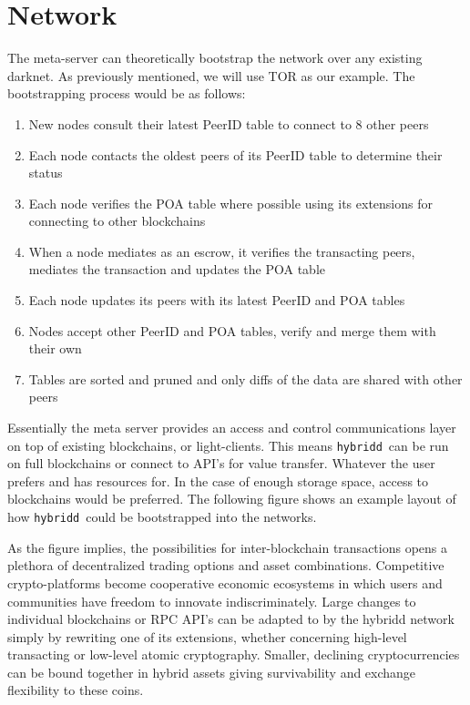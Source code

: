\documentclass[11pt, a4paper]{article}
\newcommand{\hybridd}{\texttt{hybridd}\, }
\begin{document}
\section{Network}

The meta-server can theoretically bootstrap the network over any existing darknet. As previously mentioned, we will use TOR as our example. The bootstrapping process would be as follows:

\begin{enumerate}
\item New nodes consult their latest PeerID table to connect to 8 other peers
\item Each node contacts the oldest peers of its PeerID table to determine their status
\item Each node verifies the POA table where possible using its extensions
	    for connecting to other blockchains
\item When a node mediates as an escrow, it verifies the transacting peers,
	    mediates the transaction and updates the POA table
\item Each node updates its peers with its latest PeerID and POA tables
\item Nodes accept other PeerID and POA tables, verify and merge them with their own
\item Tables are sorted and pruned and only diffs of the data are shared with other peers
\end{enumerate}

Essentially the meta server provides an access and control communications layer on top of existing blockchains, or light-clients. This means \hybridd can be run on full blockchains or connect to API's for value transfer. Whatever the user prefers and has resources for. In the case of enough storage space, access to blockchains would be preferred. The following figure shows an example layout of how \hybridd could be bootstrapped into the networks.

As the figure implies, the possibilities for inter-blockchain transactions opens a plethora of decentralized trading options and asset combinations. Competitive crypto-platforms become cooperative economic ecosystems in which users and communities have freedom to innovate indiscriminately. Large changes to individual blockchains or RPC API's can be adapted to by the hybridd network simply by rewriting one of its extensions, whether concerning high-level transacting or low-level atomic cryptography. Smaller, declining cryptocurrencies can be bound together in hybrid assets giving survivability and exchange flexibility to these coins.
\end{document}
